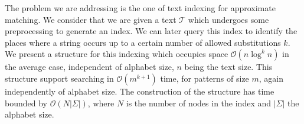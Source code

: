 The problem we are addressing is the one of text indexing for approximate matching. We consider that we are given a text $\mathcal{T}$ which undergoes some preprocessing to generate an index. We can later query this index to identify the places where a string occurs up to a certain number of allowed substitutions $k$. We present a structure for this indexing which occupies space $\mathcal{O}(n\log^kn)$ in the average case, independent of alphabet size, $n$ being the text size. This structure support searching in $\mathcal{O}(m^{k+1})$ time, for patterns of size $m$, again independently of alphabet size. The construction of the structure has time bounded by $\mathcal{O}(N|\Sigma|)$, where $N$ is the number of nodes in the index and $|\Sigma|$ the alphabet size.
